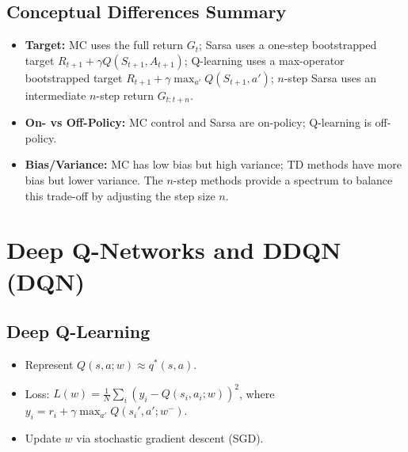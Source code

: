 \documentclass[12pt]{article}
\begin{document}
\subsection{Conceptual Differences Summary}
\begin{itemize}
    \item \textbf{Target:} MC uses the full return $G_t$; Sarsa uses a one-step bootstrapped target $R_{t+1}+\gamma Q(S_{t+1},A_{t+1})$; Q-learning uses a max-operator bootstrapped target $R_{t+1}+\gamma \max_{a'}Q(S_{t+1},a')$; $n$-step Sarsa uses an intermediate $n$-step return $G_{t:t+n}$.
    \item \textbf{On- vs Off-Policy:} MC control and Sarsa are on-policy; Q-learning is off-policy.
    \item \textbf{Bias/Variance:} MC has low bias but high variance; TD methods have more bias but lower variance. The $n$-step methods provide a spectrum to balance this trade-off by adjusting the step size $n$.
\end{itemize}

\section{Deep Q-Networks and DDQN (DQN) }

\subsection{Deep Q-Learning}
\begin{itemize}
    \item Represent $Q(s,a; w) \approx q^*(s,a)$.
    \item Loss: $L(w) = \frac{1}{N} \sum_i (y_i - Q(s_i, a_i; w))^2$, where $y_i = r_i + \gamma \max_{a'} Q(s_i', a'; w^-)$.
    \item Update $w$ via stochastic gradient descent (SGD).
\end{itemize}
\end{document}

